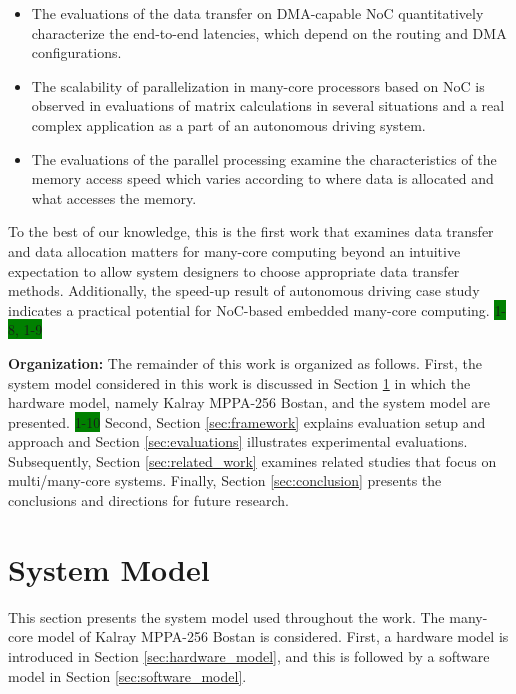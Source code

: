 \documentclass[conference,compsoc]{IEEEtran}
\begin{document}
\begin{itemize}
\item The evaluations of the data transfer on DMA-capable NoC quantitatively characterize the end-to-end latencies, which depend on the routing and DMA configurations.
\item The scalability of parallelization in many-core processors based on NoC is observed in evaluations of matrix calculations in several situations and a real complex application as a part of an autonomous driving system.
\item The evaluations of the parallel processing examine the characteristics of the memory access speed which varies according to where data is allocated and what accesses the memory.
\end{itemize}

To the best of our knowledge, this is the first work that examines data transfer and data allocation matters for many-core computing beyond an intuitive expectation to allow system designers to choose appropriate data transfer methods.
Additionally, the speed-up result of autonomous driving case study indicates a practical potential for NoC-based embedded many-core computing.
\colorbox{green}{1-8, 1-9}

\textbf{Organization:}
The remainder of this work is organized as follows.
First, the system model considered in this work is discussed in Section \ref{sec:system_model} in which the hardware model, namely Kalray MPPA-256 Bostan, and the system model are presented.
\colorbox{green}{1-10}
Second, Section \ref{sec:framework} explains evaluation setup and approach and Section \ref{sec:evaluations} illustrates experimental evaluations.
Subsequently, Section \ref{sec:related_work} examines related studies that focus on multi/many-core systems.
Finally, Section \ref{sec:conclusion} presents the conclusions and directions for future research.


\section{System Model}
\label{sec:system_model}
This section presents the system model used throughout the work.
The many-core model of Kalray MPPA-256 Bostan is considered.
First, a hardware model is introduced in Section \ref{sec:hardware_model}, and this is followed by a software model in Section \ref{sec:software_model}.
\end{document}
